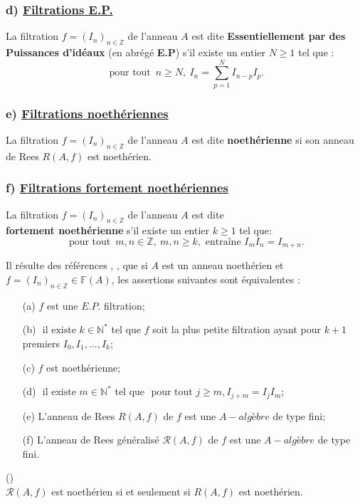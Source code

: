 \subsubsection{d) \underline{Filtrations E.P.}}
\begin{madefinition}
	La filtration $f = (I_n)_{n \in \mathbb{Z}}$ de l'anneau $A$ est dite \textbf{Essentiellement par des Puissances d'idéaux} (en abrégé \textbf{E.P}) s'il existe un entier $N \geqslant 1$ tel que :
	\[ \text{ pour tout } \, n \geqslant N, \ I_n =\sum_{p=1}^{N} I_{n-p}I_p. \]
\end{madefinition}
\subsubsection{e) \underline{Filtrations noethériennes}}
\begin{madefinition}
	La filtration $f = (I_n)_{n \in \mathbb{Z}}$ de l'anneau $A$ est dite \textbf{noethérienne} si son anneau de Rees ${R}(A,f)$ est noethérien.
\end{madefinition}
\subsubsection{f) \underline{Filtrations fortement noethériennes}}
\begin{madefinition}
	La filtration $f = (I_n)_{n \in \mathbb{Z}}$ de l'anneau $A$ est dite \\ \textbf{fortement noethérienne} s'il existe un entier $k \geqslant 1$ tel que:
	\[ \text{ pour tout } \, m, n \in \mathbb{Z}, \ m, n \geqslant k, \text{ entraîne } I_m I_n = I_{m+n}. \]
\end{madefinition}
\begin{maremarque}
	Il résulte des références \cite{Di1} , \cite{Di3}, \cite{Di4} que si $A$ est un anneau noethérien et $f=(I_n)_{n \in \mathbb{Z}} \in \mathbb{F}(A)$, les assertions suivantes sont équivalentes : 
	\begin{enumerate}
		\item[(a)] $f$ est une $E.P.$ filtration;
		\item[(b)] $\text{ il existe } k \in \mathbb{N}^{*}$ tel que $f$ soit la plus petite filtration ayant pour $k+1$ premiers $I_0, I_1,\dots, I_k $;
		\item[(c)] $f$ est noethérienne;
		\item[(d)] $\text{ il existe } m \in \mathbb{N}^{*}$ tel que $\text{ pour tout } j \geqslant m, I_{j+m} = I_{j}I_{m}$;
		\item[(e)] L'anneau de Rees $R(A,f)$ de $f$ est une $A-algèbre$ de type fini;
		\item[(f)] L'anneau de Rees généralisé $\mathcal{R}(A,f)$ de $f$ est une $A-algèbre$ de type fini.
	\end{enumerate}
\end{maremarque}
\begin{maremarque}(\cite{Di3})\\
	$\mathcal{R}(A,f)$ est noethérien si et seulement si $R(A,f)$ est noethérien.
\end{maremarque}

